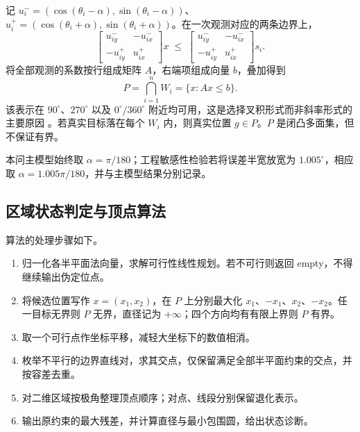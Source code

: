 \documentclass[UTF8,a4paper,zihao=-4,fontset=none]{ctexart}
\begin{document}
记 \(u_i^-=(\cos(\theta_i-\alpha),\sin(\theta_i-\alpha))\)、\(u_i^+=(\cos(\theta_i+\alpha),\sin(\theta_i+\alpha))\)。在一次观测对应的两条边界上，
\begin{equation}
  \begin{bmatrix}u_{iy}^- & -u_{ix}^-\\[2pt] -u_{iy}^+ & u_{ix}^+\end{bmatrix}x
  \;\le\;
  \begin{bmatrix}u_{iy}^- & -u_{ix}^-\\[2pt] -u_{iy}^+ & u_{ix}^+\end{bmatrix}s_i .
  \label{eq:halfplane}
\end{equation}
将全部观测的系数按行组成矩阵 \(A\)，右端项组成向量 \(b\)，叠加得到
\begin{equation}
  P=\bigcap_{i=1}^{n}W_i=\{x:Ax\le b\}.
  \label{eq:P}
\end{equation}
该表示在 \(90^\circ\)、\(270^\circ\) 以及 \(0^\circ/360^\circ\) 附近均可用，这是选择叉积形式而非斜率形式的主要原因 \cite{Tokekar2013}。若真实目标落在每个 \(W_i\) 内，则真实位置 \(g\in P\)。\(P\) 是闭凸多面集，但不保证有界。

本问主模型始终取 \(\alpha=\pi/180\)；工程敏感性检验若将误差半宽放宽为 \(1.005^\circ\)，相应取 \(\alpha=1.005\pi/180\)，并与主模型结果分别记录。

\subsection{区域状态判定与顶点算法}

算法的处理步骤如下。

\begin{enumerate}[label=(\arabic*),leftmargin=2.2em]
  \item 归一化各半平面法向量，求解可行性线性规划。若不可行则返回 empty，不得继续输出伪定位点。
  \item 将候选位置写作 \(x=(x_1,x_2)\)，在 \(P\) 上分别最大化 \(x_1\)、\(-x_1\)、\(x_2\)、\(-x_2\)。任一目标无界则 \(P\) 无界，直径记为 \(+\infty\)；四个方向均有有限上界则 \(P\) 有界。
  \item 取一个可行点作坐标平移，减轻大坐标下的数值相消。
  \item 枚举不平行的边界直线对，求其交点，仅保留满足全部半平面约束的交点，并按容差去重。
  \item 对二维区域按极角整理顶点顺序；对点、线段分别保留退化表示。
  \item 输出原约束的最大残差，并计算直径与最小包围圆，给出状态诊断。
\end{enumerate}
\end{document}
